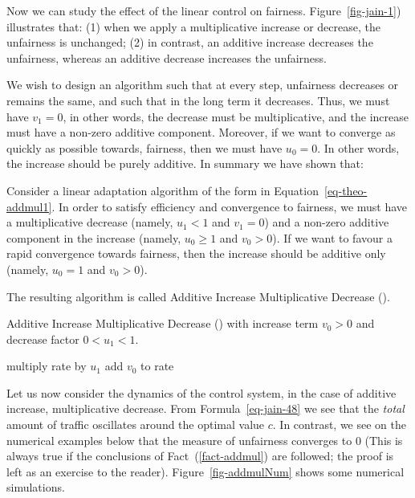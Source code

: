 Now we can study the effect of the linear control on fairness.
Figure~\ref{fig-jain-1}) illustrates that: (1) when we apply a
multiplicative increase or decrease, the unfairness is unchanged;
(2) in contrast, an additive increase decreases the unfairness,
whereas an additive decrease increases the unfairness.

We wish to design an algorithm such that at every step, unfairness
decreases or remains the same, and such that in the long term it
decreases. Thus,  we must have $v_{1}=0$, in other words, the
decrease must be multiplicative, and the increase must have a
non-zero additive component. Moreover, if we want to converge as
quickly as possible towards, fairness, then we must have
$u_{0}=0$. In other words, the increase should be purely additive.
In summary we have shown that:
\begin{fact}
Consider a linear adaptation algorithm of the form in
Equation~\ref{eq-theo-addmul1}. In order to satisfy efficiency and
convergence to fairness, we must have a multiplicative decrease
(namely, $u_{1}<1$ and $v_{1}=0$) and a non-zero additive
component in the increase (namely, $u_{0}\geq 1$ and $v_{0}>0$).
If we want to favour a rapid convergence towards fairness, then
the increase should be additive only (namely, $u_{0}= 1$ and
$v_{0}>0$). \label{fact-addmul}
\end{fact}

The resulting algorithm is called Additive Increase Multiplicative
Decrease ().

\begin{algorithm}
\caption{Additive Increase Multiplicative Decrease () with
increase term $v_0>0$ and decrease factor
$0<u_1<1$.}\label{alg:aimd}
\begin{algorithmic}[0]%
 \State multiply rate by $u_1$
 \Else
 \State add $v_0$ to rate
 \EndIf
\end{algorithmic}
\end{algorithm}



 Let us now consider the dynamics of the
control system, in the case of additive increase, multiplicative
decrease. From Formula~\ref{eq-jain-48} we see that the \emph{total}
amount of traffic oscillates around the optimal value $c$.  In
contrast, we see on the numerical examples below that the measure of
unfairness converges to $0$ (This is always true if the conclusions
of Fact~(\ref{fact-addmul}) are followed; the proof is left as an
exercise to the reader). Figure~\ref{fig-addmulNum} shows some
numerical simulations.

